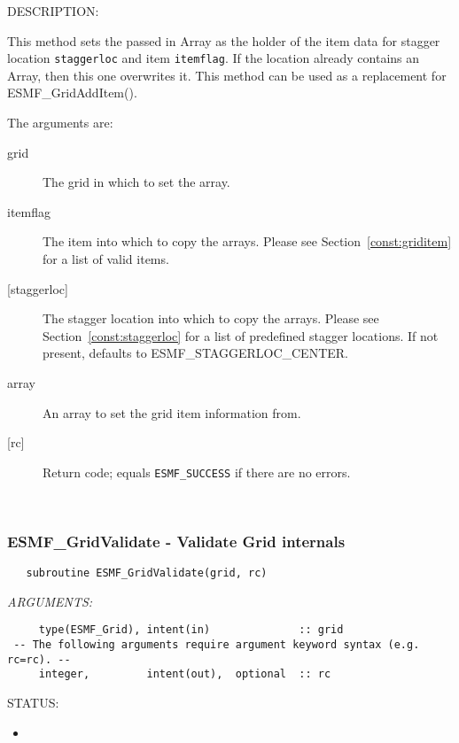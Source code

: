 {\sf DESCRIPTION:\\ }


     This method sets the passed in Array as the holder of the item data
     for stagger location {\tt staggerloc} and item {\tt itemflag}. If the location
     already contains an Array, then this one overwrites it. This method can
     be used as a replacement for ESMF\_GridAddItem().
  
       The arguments are:
  \begin{description}
  \item[grid]
      The grid in which to set the array.
  \item[itemflag]
      The item into which to copy the arrays. Please see Section~\ref{const:griditem} for a
      list of valid items.
  \item[{[staggerloc]}]
      The stagger location into which to copy the arrays.
      Please see Section~\ref{const:staggerloc} for a list
      of predefined stagger locations. If not present, defaults to
      ESMF\_STAGGERLOC\_CENTER.
  \item[array]
      An array to set the grid item information from.
  \item[{[rc]}]
      Return code; equals {\tt ESMF\_SUCCESS} if there are no errors.
  \end{description}
   
 
\mbox{}\hrulefill\ 
 
\subsubsection [ESMF\_GridValidate] {ESMF\_GridValidate - Validate Grid internals}


 
\begin{verbatim}   subroutine ESMF_GridValidate(grid, rc)\end{verbatim}{\em ARGUMENTS:}
\begin{verbatim}     type(ESMF_Grid), intent(in)              :: grid
 -- The following arguments require argument keyword syntax (e.g. rc=rc). --
     integer,         intent(out),  optional  :: rc\end{verbatim}
{\sf STATUS:}
   \begin{itemize}
   \item{}
   \end{itemize}
  
